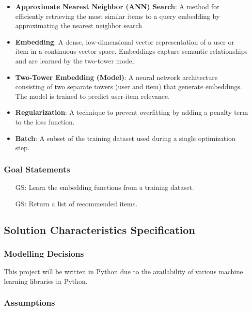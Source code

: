 \documentclass[12pt]{article}
\newcounter{goalnum} %
\begin{document}
\begin{itemize}

  \item \textbf{Approximate Nearest Neighbor (ANN) Search}: A method for efficiently retrieving the most similar items to a query embedding by approximating the nearest neighbor search
  \item \textbf{Embedding}: A dense, low-dimensional vector representation of a user or item in a continuous vector space. Embeddings capture semantic relationships and are learned by the two-tower model.
  \item \textbf{Two-Tower Embedding (Model)}: A neural network architecture consisting of two separate towers (user and item) that generate embeddings. The model is trained to predict user-item relevance.
  \item \textbf{Regularization}: A technique to prevent overfitting by adding a penalty term to the loss function.
  \item  \textbf{Batch}: A subset of the training dataset used during a single optimization step.

\end{itemize}

\subsubsection{Goal Statements}

\begin{itemize}

\item[GS\refstepcounter{goalnum}\thegoalnum \label{GS1}:] Learn the embedding functions from a training dataset.
\item[GS\refstepcounter{goalnum}\thegoalnum \label{GS2}:] Return a list of recommended items.
\end{itemize}


\subsection{Solution Characteristics Specification}

\subsubsection{Modelling Decisions}

This project will be written in Python due to the availability of various machine learning libraries in Python.

\subsubsection{Assumptions} \label{sec_assumpt}
\end{document}
